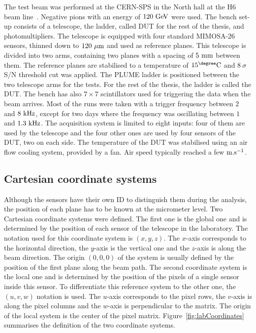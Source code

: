     The test beam was performed at the \gls{CERN}-\gls{SPS} in the North hall at the H6 beam line~\cite{SPS}.
    Negative pions with an energy of $120~\rm{GeV}$ were used.
    The bench set-up consists of a telescope, the ladder, called \gls{DUT} for the rest of the thesis, and photomultipliers.
    The telescope is equipped with four standard \gls{MIMOSA}-26 sensors, thinned down to $120~\rm{\mu m}$ and used as reference planes.
    This telescope is divided into two arms, containing two planes with a spacing of $5~\rm{mm}$ between them.
    The reference planes are stabilised to a temperature of $15^{\degree}\rm{C}$ and $8~\sigma$ S/N threshold cut was applied.
    The \gls{PLUME} ladder is positioned between the two telescope arms for the tests.
    For the rest of the thesis, the ladder is called the \gls{DUT}.
    The bench has also $7 \times 7$ scintillators used for triggering the data when the beam arrives.
    Most of the runs were taken with a trigger frequency between $2$ and $8~\rm{kHz}$, except for two days where the frequency was oscillating between $1$ and $1.3~\rm{kHz}$.
    The acquisition system is limited to eight inputs: four of them are used by the telescope and the four other ones are used by four sensors of the \gls{DUT}, two on each side.
    The temperature of the \gls{DUT} was stabilised using an air flow cooling system, provided by a fan.
    Air speed typically reached a few $\rm{m.s}^{-1}$.

    \subsection{Cartesian coordinate systems}

    Although the sensors have their own ID to distinguish them during the analysis, the position of each plane has to be known at the micrometer level.
    Two Cartesian coordinate systems were defined.
    The first one is the global one and is determined by the position of each sensor of the telescope in the laboratory.
    The notation used for this coordinate system is $(x,y,z)$.
    The $x$-axis corresponds to the horizontal direction, the $y$-axis is the vertical one and the $z$-axis is along the beam direction.
    The origin $(0,0,0)$ of the system is usually defined by the position of the first plane along the beam path.
    The second coordinate system is the local one and is determined by the position of the pixels of a single sensor inside this sensor.
    To differentiate this reference system to the other one, the $(u,v,w)$ notation is used.
    The $u$-axis corresponds to the pixel rows, the $v$-axis is along the pixel columns and the $w$-axis is perpendicular to the matrix.
    The origin of the local system is the center of the pixel matrix.
    Figure~\ref{fig:labCoordinates} summarises the definition of the two coordinate systems.

